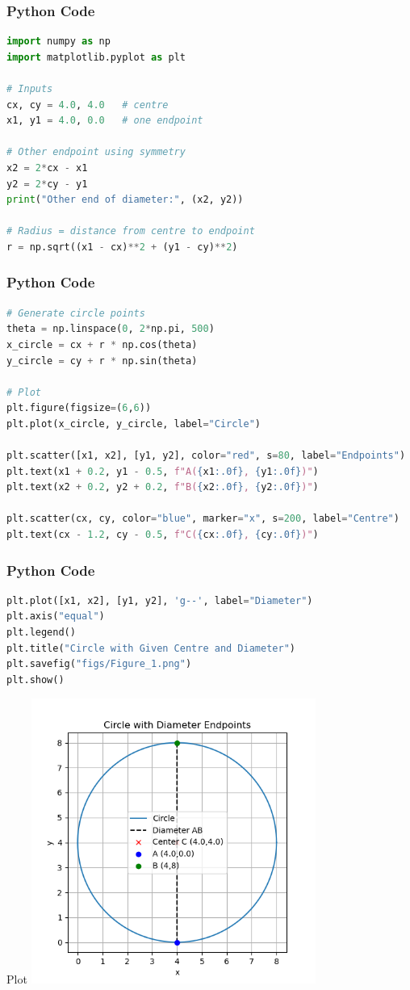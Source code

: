 \documentclass{beamer}
\begin{document}
\begin{frame}[fragile]
    \frametitle{Python Code}
    \begin{lstlisting}[language=Python]
import numpy as np
import matplotlib.pyplot as plt

# Inputs
cx, cy = 4.0, 4.0   # centre
x1, y1 = 4.0, 0.0   # one endpoint

# Other endpoint using symmetry
x2 = 2*cx - x1
y2 = 2*cy - y1
print("Other end of diameter:", (x2, y2))

# Radius = distance from centre to endpoint
r = np.sqrt((x1 - cx)**2 + (y1 - cy)**2)
    \end{lstlisting}
\end{frame}

\begin{frame}[fragile]
    \frametitle{Python Code}
    \begin{lstlisting}[language=Python]
# Generate circle points
theta = np.linspace(0, 2*np.pi, 500)
x_circle = cx + r * np.cos(theta)
y_circle = cy + r * np.sin(theta)

# Plot
plt.figure(figsize=(6,6))
plt.plot(x_circle, y_circle, label="Circle")

plt.scatter([x1, x2], [y1, y2], color="red", s=80, label="Endpoints")
plt.text(x1 + 0.2, y1 - 0.5, f"A({x1:.0f}, {y1:.0f})")
plt.text(x2 + 0.2, y2 + 0.2, f"B({x2:.0f}, {y2:.0f})")

plt.scatter(cx, cy, color="blue", marker="x", s=200, label="Centre")
plt.text(cx - 1.2, cy - 0.5, f"C({cx:.0f}, {cy:.0f})")
    \end{lstlisting}
\end{frame}

\begin{frame}[fragile]
    \frametitle{Python Code}
    \begin{lstlisting}[language=Python]
plt.plot([x1, x2], [y1, y2], 'g--', label="Diameter")
plt.axis("equal")
plt.legend()
plt.title("Circle with Given Centre and Diameter")
plt.savefig("figs/Figure_1.png")
plt.show()
    \end{lstlisting}
\end{frame}

\begin{frame}{Plot}
    \centering
    \includegraphics[width=0.7\textwidth, height=0.8\textheight]{figs/Figure_1.png}     
\end{frame}
\end{document}
